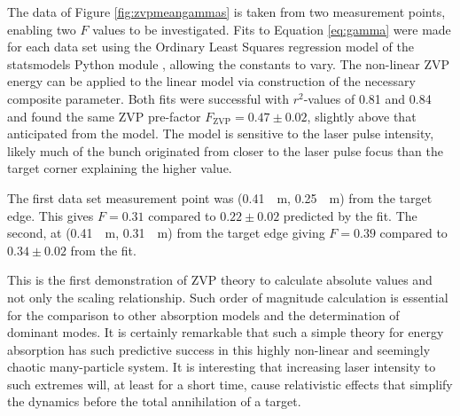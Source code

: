 The data of Figure \ref{fig:zvpmeangammas} is taken from two measurement points, enabling two $F$ values to be investigated. Fits to Equation \ref{eq:gamma} were made for each data set using the Ordinary Least Squares regression model of the statsmodels Python module \cite{seabold2010statsmodels}, allowing the constants to vary. The non-linear ZVP energy can be applied to the linear model via construction of the necessary composite parameter. Both fits were successful with $r^2$-values of 0.81 and 0.84 and found the same ZVP pre-factor $F_\mathrm{ZVP} = 0.47 \pm 0.02$, slightly above that anticipated from the model. The model is sensitive to the laser pulse intensity, likely much of the bunch originated from closer to the laser pulse focus than the target corner explaining the higher value.

The first data set measurement point was (\qty{0.41}{\mu m}, \qty{0.25}{\mu m}) from the target edge. This gives $F = 0.31$ compared to $0.22 \pm 0.02$ predicted by the fit. The second, at (\qty{0.41}{\mu m}, \qty{0.31}{\mu m}) from the target edge giving $F = 0.39$ compared to $0.34 \pm 0.02$ from the fit.

This is the first demonstration of ZVP theory to calculate absolute values and not only the scaling relationship. Such order of magnitude calculation is essential for the comparison to other absorption models and the determination of dominant modes. It is certainly remarkable that such a simple theory for energy absorption has such predictive success in this highly non-linear and seemingly chaotic many-particle system. It is interesting that increasing laser intensity to such extremes will, at least for a short time, cause relativistic effects that simplify the dynamics before the total annihilation of a target.

